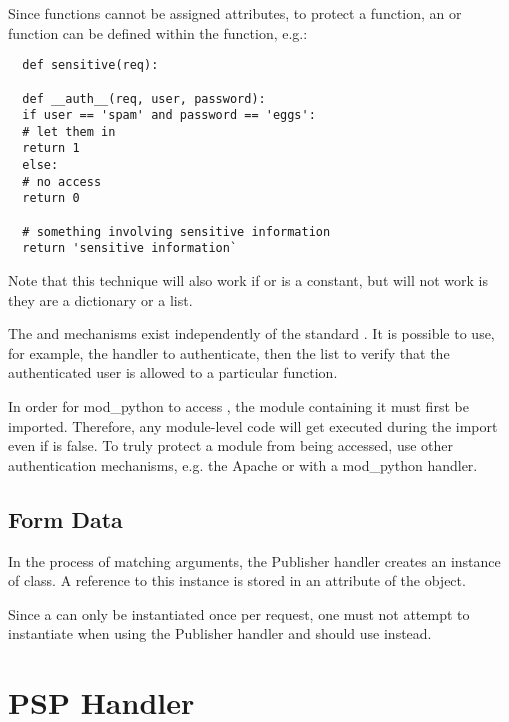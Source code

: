 Since functions cannot be assigned attributes, to protect a function,
an  or  function can be defined within
the function, e.g.:

\begin{verbatim}
  def sensitive(req):

  def __auth__(req, user, password):
  if user == 'spam' and password == 'eggs':
  # let them in
  return 1
  else:
  # no access
  return 0

  # something involving sensitive information
  return 'sensitive information`
\end{verbatim}

Note that this technique will also work if  or
 is a constant, but will not work is they are
a dictionary or a list. 

The  and  mechanisms exist
independently of the standard 
. It
is possible to use, for example, the handler to authenticate, then the
 list to verify that the authenticated user is
allowed to a particular function. 

\begin{notice}In order for mod_python to access ,
the module containing it must first be imported. Therefore, any
module-level code will get executed during the import even if
 is false.  To truly protect a module from
being accessed, use other authentication mechanisms, e.g. the Apache
 or with a mod_python  handler.
\end{notice}
     
\subsection{Form Data}

In the process of matching arguments, the Publisher handler creates an
instance of 
class. A reference to this instance is stored in an attribute 
of the  object.

Since a  can only be instantiated once per
request, one must not attempt to instantiate  when
using the Publisher handler and should use
 instead.


\section{PSP Handler\label{hand-psp}}

